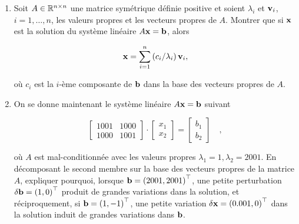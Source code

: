 \begin{enumerate}[label=\alph*)]
  \item Soit $A \in \mathbb{R}^{n \times n}$ une matrice symétrique définie positive et soient $\lambda_{i}$ et $\mathbf{v}_{i}$, $i = 1, \dots, n$, les valeurs propres et les vecteurs propres de $A$.
  Montrer que si $\mathbf{x}$ est la solution du système linéaire $A \mathbf{x} = \mathbf{b}$, alors

  \begin{equation*}
    \mathbf{x} = \sum_{i = 1}^{n} \left(c_{i} / \lambda_{i}\right) \mathbf{v}_{i},
  \end{equation*}

  où $c_{i}$ est la $i$-ème composante de $\mathbf{b}$ dans la base des vecteurs propres de $A$.
  
  \item On se donne maintenant le système linéaire $A \mathbf{x} = \mathbf{b}$ suivant
  
  \begin{equation*}
        \begin{bmatrix}
          1001 & 1000  \\
          1000 & 1001
        \end{bmatrix}
        \cdot
        \begin{bmatrix}
          x_{1}   \\
          x_{2} 
        \end{bmatrix}
        =
        \begin{bmatrix}
          b_{1}   \\
          b_{2} 
        \end{bmatrix}
        \quad 
        ,
  \end{equation*}
  
  où $A$ est mal-conditionnée avec les valeurs propres $\lambda_{1} = 1, \lambda_{2} = 2001$.
  En décomposant le second membre sur la base des vecteurs propres de la matrice $A$, expliquer pourquoi, lorsque $\mathbf{b} = \left(2001, 2001\right)^{\top}$, une petite perturbation $\delta \mathbf{b} = \left(1, 0\right)^{\top}$ produit de grandes variations dans la solution, et réciproquement, si $\mathbf{b} = \left(1, -1\right)^{\top}$, une petite variation $\delta \mathbf{x} = \left(0.001, 0\right)^{\top}$ dans la solution induit de grandes variations dans $\mathbf{b}$.
  
  
\end{enumerate}

